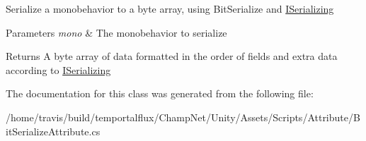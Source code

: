 Serialize a monobehavior to a byte array, using Bit\-Serialize and \hyperlink{interface_i_serializing}{I\-Serializing} 


\begin{DoxyParams}{Parameters}
{\em mono} & The monobehavior to serialize\\
\hline
\end{DoxyParams}
\begin{DoxyReturn}{Returns}
A byte array of data formatted in the order of fields and extra data according to \hyperlink{interface_i_serializing}{I\-Serializing}
\end{DoxyReturn}


The documentation for this class was generated from the following file\-:\begin{DoxyCompactItemize}
\item 
/home/travis/build/temportalflux/\-Champ\-Net/\-Unity/\-Assets/\-Scripts/\-Attribute/Bit\-Serialize\-Attribute.\-cs\end{DoxyCompactItemize}
